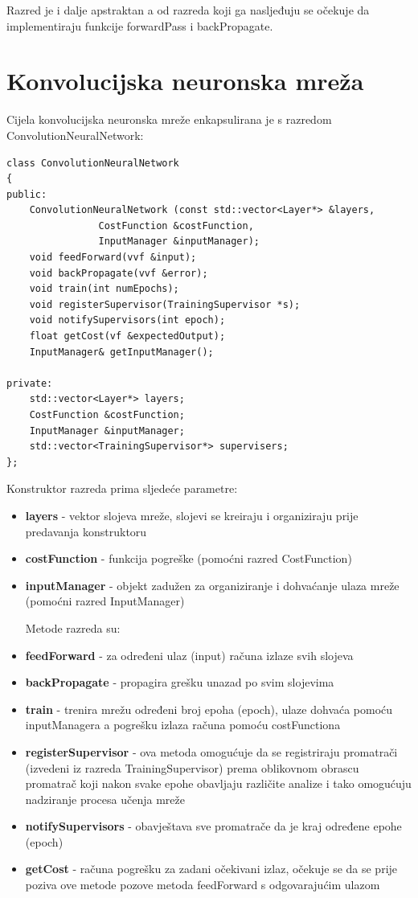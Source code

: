 \documentclass[times, utf8, zavrsni, numeric]{fer}
\begin{document}
Razred je i dalje apstraktan a od razreda koji ga nasljeđuju se očekuje da implementiraju funkcije forwardPass i backPropagate.

\section{Konvolucijska neuronska mreža}
Cijela konvolucijska neuronska mreže enkapsulirana je s razredom ConvolutionNeuralNetwork:
\begin{lstlisting}[caption=Razred ConvolutionNeuralNetwork,
  label=CNN]
class ConvolutionNeuralNetwork
{
public:
    ConvolutionNeuralNetwork (const std::vector<Layer*> &layers, 
    			CostFunction &costFunction, 
    			InputManager &inputManager);
    void feedForward(vvf &input);
    void backPropagate(vvf &error);
    void train(int numEpochs);
    void registerSupervisor(TrainingSupervisor *s);
    void notifySupervisors(int epoch);
    float getCost(vf &expectedOutput);
    InputManager& getInputManager();
    
private:
    std::vector<Layer*> layers;
    CostFunction &costFunction;
    InputManager &inputManager;
    std::vector<TrainingSupervisor*> supervisers;
};
\end{lstlisting}

Konstruktor razreda prima sljedeće parametre:
\begin{itemize}
\item \textbf{layers} - vektor slojeva mreže, slojevi se kreiraju i organiziraju prije predavanja konstruktoru
\item \textbf{costFunction} - funkcija pogreške (pomoćni razred CostFunction)
\item \textbf{inputManager} - objekt zadužen za organiziranje i dohvaćanje ulaza mreže (pomoćni razred InputManager)

Metode razreda su:
\item \textbf{feedForward} - za određeni ulaz (input) računa izlaze svih slojeva
\item \textbf{backPropagate} - propagira grešku unazad po svim slojevima
\item \textbf{train} - trenira mrežu određeni broj epoha (epoch), ulaze dohvaća pomoću inputManagera a pogrešku izlaza računa pomoću costFunctiona
\item \textbf{registerSupervisor} - ova metoda omogućuje da se registriraju promatrači (izvedeni iz razreda TrainingSupervisor) prema oblikovnom obrascu promatrač koji nakon svake epohe obavljaju različite analize i tako omogućuju nadziranje procesa učenja mreže
\item \textbf{notifySupervisors} - obavještava sve promatrače da je kraj određene epohe (epoch)
\item \textbf{getCost} - računa pogrešku za zadani očekivani izlaz, očekuje se da se prije poziva ove metode pozove metoda feedForward s odgovarajućim ulazom
\end{itemize}
\end{document}
